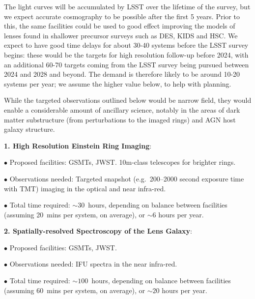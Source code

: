The light curves will be accumulated by LSST over the lifetime of the
survey, but we expect accurate cosmography to be possible after the
first 5 years.  Prior to this, the same facilities could be used to good
effect improving the models of lenses found in shallower precursor
surveys such as DES, KIDS and HSC. We expect to have good time delays
for about 30-40 systems before the LSST survey begins: these would be
the targets for high resolution follow-up before 2024, with an
additional 60-70 targets coming from the LSST survey being pursued
between 2024 and 2028 and beyond. The demand is therefore likely to be
around 10-20 systems per year; we assume the higher value below, to help
with planning.

While the targeted observations outlined below would be narrow field,
they would enable a considerable amount of ancillary science, notably in
the areas of dark matter substructure (from perturbations to the imaged
rings) and AGN host galaxy structure.


{\bf 1. High Resolution Einstein Ring Imaging}:

$\bullet$ Proposed facilities: GSMTs, JWST. 10m-class telescopes for
brighter rings.

$\bullet$ Observations needed: Targeted snapshot (e.g.\ 200--2000
second exposure time with TMT) imaging in the optical and near infra-red.

$\bullet$ Total time required: $\sim30$~hours, depending
on balance between facilities (assuming 20~mins per system, on average),
or $\sim 6$ hours per year.

{\bf 2. Spatially-resolved Spectroscopy of the Lens Galaxy}:

$\bullet$ Proposed facilities: GSMTs, JWST.

$\bullet$ Observations needed: IFU spectra in the near infra-red.

$\bullet$ Total time required: $\sim100$~hours, depending
on balance between facilities (assuming 60~mins per system, on average),
or $\sim 20$ hours per year.
